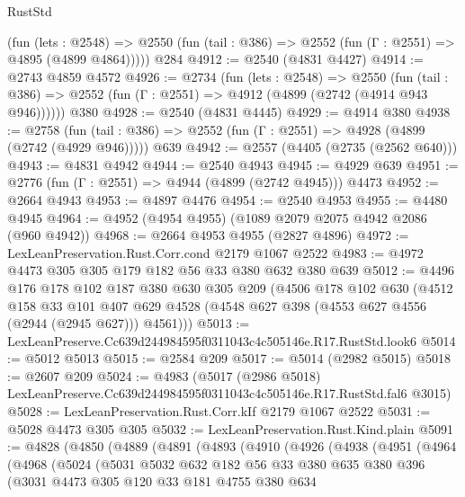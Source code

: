 \begin{lexlean}{RustStd}
\begin{coremodule}
      (fun (lets : @2548) =>
      @2550 (fun (tail : @386) => @2552 (fun (Γ : @2551) => @4895 (@4899 @4864)))))
    @284
@4912 := @2540 (@4831 @4427)
@4914 := @2743 @4859 @4572
@4926 := @2734
    (fun (lets : @2548) =>
    @2550 (fun (tail : @386) => @2552 (fun (Γ : @2551) => @4912 (@4899 (@2742 (@4914 @943 @946))))))
    @380
@4928 := @2540 (@4831 @4445)
@4929 := @4914 @380
@4938 := @2758
    (fun (tail : @386) => @2552 (fun (Γ : @2551) => @4928 (@4899 (@2742 (@4929 @946)))))
    @639
@4942 := @2557 (@4405 (@2735 (@2562 @640)))
@4943 := @4831 @4942
@4944 := @2540 @4943
@4945 := @4929 @639
@4951 := @2776 (fun (Γ : @2551) => @4944 (@4899 (@2742 @4945))) @4473
@4952 := @2664 @4943
@4953 := @4897 @4476
@4954 := @2540 @4953
@4955 := @4480 @4945
@4964 := @4952 (@4954 @4955) (@1089 @2079 @2075 @4942 @2086 (@960 @4942))
@4968 := @2664 @4953 @4955 (@2827 @4896)
@4972 := LexLeanPreservation.Rust.Corr.cond @2179 @1067 @2522
@4983 := @4972 @4473 @305 @305 @179 @182 @56 @33 @380 @632 @380 @639
@5012 := @4496
    @176
    @178
    @102
    @187
    @380
    @630
    @305
    @209
    (@4506
      @178
      @102
      @630
      (@4512
        @158
        @33
        @101
        @407
        @629
        @4528
        (@4548 @627 @398 (@4553 @627 @4556 (@2944 (@2945 @627))) @4561)))
@5013 := LexLeanPreserve.Cc639d244984595f0311043c4c505146e.R17.RustStd.look6
@5014 := @5012 @5013
@5015 := @2584 @209
@5017 := @5014 (@2982 @5015)
@5018 := @2607 @209
@5024 := @4983
    (@5017 (@2986 @5018) LexLeanPreserve.Cc639d244984595f0311043c4c505146e.R17.RustStd.fal6 @3015)
@5028 := LexLeanPreservation.Rust.Corr.kIf @2179 @1067 @2522
@5031 := @5028 @4473 @305 @305
@5032 := LexLeanPreservation.Rust.Kind.plain
@5091 := @4828
    (@4850
      (@4889
        (@4891
          (@4893
            (@4910
              (@4926
                (@4938
                  (@4951
                    (@4964
                      (@4968
                        (@5024
                          (@5031
                            @5032
                            @632
                            @182
                            @56
                            @33
                            @380
                            @635
                            @380
                            @396
                            (@3031
                              @4473
                              @305
                              @120
                              @33
                              @181
                              @4755
                              @380
                              @634

\end{coremodule}
\end{lexlean}
